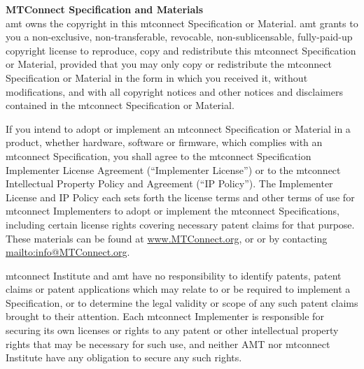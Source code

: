 \documentclass{mtconnect}	%
\begin{document}
\begin{nolinenumbers}
	\maketitle				%


\textbf{\color{mtc1}\Large MTConnect Specification and Materials} \\

\gls{amt} owns the copyright in this \gls{mtconnect} Specification or Material. \gls{amt} grants to you a non-exclusive, non-transferable, revocable, non-sublicensable, fully-paid-up copyright license to reproduce, copy and redistribute this \gls{mtconnect} Specification or Material, provided that you may only copy or redistribute the \gls{mtconnect} Specification or Material in the form in which you received it, without modifications, and with all copyright notices and other notices and disclaimers contained in the \gls{mtconnect} Specification or Material.

If you intend to adopt or implement an \gls{mtconnect} Specification or Material in a product, whether hardware, software or firmware, which complies with an \gls{mtconnect} Specification, you shall agree to the \gls{mtconnect} Specification Implementer License Agreement (``Implementer License'') or to the \gls{mtconnect} Intellectual Property Policy and Agreement (``IP Policy''). The Implementer License and IP Policy each sets forth the license terms and other terms of use for \gls{mtconnect} Implementers to adopt or implement the \gls{mtconnect} Specifications, including certain license rights covering necessary patent claims for that purpose. These materials can be found at \url{www.MTConnect.org}, or or by contacting \url{mailto:info@MTConnect.org}. 

\gls{mtconnect} Institute and \gls{amt} have no responsibility to identify patents, patent claims or patent applications which may relate to or be required to implement a Specification, or to determine the legal validity or scope of any such patent claims brought to their attention. Each \gls{mtconnect} Implementer is responsible for securing its own licenses or rights to any patent or other intellectual property rights that may be necessary for such use, and neither AMT nor \gls{mtconnect} Institute have any obligation to secure any such rights.


\end{nolinenumbers}
\end{document}
